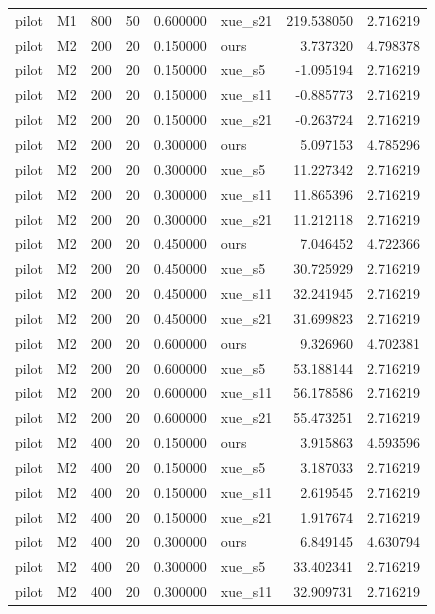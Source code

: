 \begin{longtable}{llrrrlrr}
pilot & M1 & 800 & 50 & 0.600000 & xue\_s21 & 219.538050 & 2.716219 \\
pilot & M2 & 200 & 20 & 0.150000 & ours & 3.737320 & 4.798378 \\
pilot & M2 & 200 & 20 & 0.150000 & xue\_s5 & -1.095194 & 2.716219 \\
pilot & M2 & 200 & 20 & 0.150000 & xue\_s11 & -0.885773 & 2.716219 \\
pilot & M2 & 200 & 20 & 0.150000 & xue\_s21 & -0.263724 & 2.716219 \\
pilot & M2 & 200 & 20 & 0.300000 & ours & 5.097153 & 4.785296 \\
pilot & M2 & 200 & 20 & 0.300000 & xue\_s5 & 11.227342 & 2.716219 \\
pilot & M2 & 200 & 20 & 0.300000 & xue\_s11 & 11.865396 & 2.716219 \\
pilot & M2 & 200 & 20 & 0.300000 & xue\_s21 & 11.212118 & 2.716219 \\
pilot & M2 & 200 & 20 & 0.450000 & ours & 7.046452 & 4.722366 \\
pilot & M2 & 200 & 20 & 0.450000 & xue\_s5 & 30.725929 & 2.716219 \\
pilot & M2 & 200 & 20 & 0.450000 & xue\_s11 & 32.241945 & 2.716219 \\
pilot & M2 & 200 & 20 & 0.450000 & xue\_s21 & 31.699823 & 2.716219 \\
pilot & M2 & 200 & 20 & 0.600000 & ours & 9.326960 & 4.702381 \\
pilot & M2 & 200 & 20 & 0.600000 & xue\_s5 & 53.188144 & 2.716219 \\
pilot & M2 & 200 & 20 & 0.600000 & xue\_s11 & 56.178586 & 2.716219 \\
pilot & M2 & 200 & 20 & 0.600000 & xue\_s21 & 55.473251 & 2.716219 \\
pilot & M2 & 400 & 20 & 0.150000 & ours & 3.915863 & 4.593596 \\
pilot & M2 & 400 & 20 & 0.150000 & xue\_s5 & 3.187033 & 2.716219 \\
pilot & M2 & 400 & 20 & 0.150000 & xue\_s11 & 2.619545 & 2.716219 \\
pilot & M2 & 400 & 20 & 0.150000 & xue\_s21 & 1.917674 & 2.716219 \\
pilot & M2 & 400 & 20 & 0.300000 & ours & 6.849145 & 4.630794 \\
pilot & M2 & 400 & 20 & 0.300000 & xue\_s5 & 33.402341 & 2.716219 \\
pilot & M2 & 400 & 20 & 0.300000 & xue\_s11 & 32.909731 & 2.716219 \\

\end{longtable}
